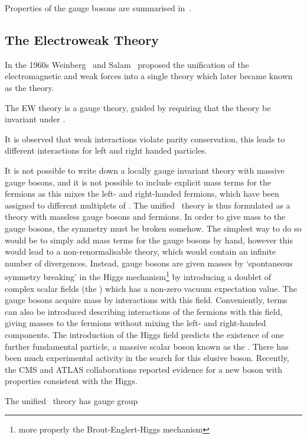 Properties of the gauge bosons are summarised in~.

\subsection{The Electroweak Theory}

In the 1960s Weinberg~\cite{PhysRevLett.19.1264} and Salam~\cite{Salam1964168} proposed the unification of the electromagnetic
and weak forces into a single theory which later became known as the
 theory.

The EW theory is a gauge theory, guided by requiring that the theory be
invariant under .

It is observed that weak interactions violate parity conservation, this leads to
different interactions for left and right handed particles.

It is not possible to write down a locally gauge invariant theory with massive
gauge bosons, and it is not possible to include explicit mass terms for the
fermions as this mixes the left- and right-handed fermions, which have been
assigned to different multiplets of \sutwo. The unified \ew\ theory is thus
formulated as a theory with massless gauge bosons and fermions. In order to give
mass to the gauge bosons, the symmetry must be broken somehow. The simplest way
to do so would be to simply add mass terms for the gauge bosons by hand, however
this would lead to a non-renormalisable theory, which would contain an infinite
number of divergences. Instead, gauge bosons are given masses by `spontaneous
symmetry breaking' in the Higgs mechanism\footnote{more properly the Brout-Englert-Higgs
mechanism} by introducing a doublet of complex scalar fields (the ) which has a non-zero vacuum expectation value. The gauge bosons acquire
mass by interactions with this field. Conveniently, terms can also be
introduced describing interactions of the fermions with this field, giving
masses to the fermions without mixing the left- and right-handed components. The
introduction of the Higgs field predicts the existence of one further
fundamental particle, a massive scalar boson known as the . There has
been much experimental activity in the search for this elusive boson. Recently,
the CMS and ATLAS collaborations reported evidence for a new boson with
properties consistent with the Higgs.

The unified \ew\ theory has gauge group

